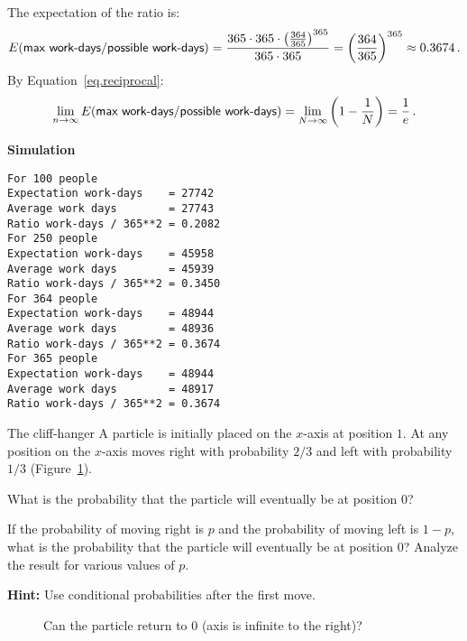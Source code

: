The expectation of the ratio is:
\[
E(\textsf{max work-days/possible work-days})=\displaystyle\frac{365\cdot 365  \cdot \left(\frac{364}{365}\right)^{365}}{365\cdot 365}=\left(\displaystyle\frac{364}{365}\right)^{365}\approx 0.3674\,.
\]
By Equation~\ref{eq.reciprocal}:
\[
\lim_{n\rightarrow\infty}E(\textsf{max work-days/possible work-days})=\lim_{N\rightarrow \infty} \left(1-\displaystyle\frac{1}{N}\right)= \displaystyle\frac{1}{e}\,.
\]

\textbf{Simulation}
\begin{verbatim}
For 100 people
Expectation work-days    = 27742
Average work days        = 27743
Ratio work-days / 365**2 = 0.2082
For 250 people
Expectation work-days    = 45958
Average work days        = 45939
Ratio work-days / 365**2 = 0.3450
For 364 people
Expectation work-days    = 48944
Average work days        = 48936
Ratio work-days / 365**2 = 0.3674
For 365 people
Expectation work-days    = 48944
Average work days        = 48917
Ratio work-days / 365**2 = 0.3674
\end{verbatim}


\newpage

\begin{prob}{The cliff-hanger}
A particle is initially placed on the $x$-axis at position $1$. At any position on the $x$-axis moves right with probability $2/3$ and left with probability $1/3$ (Figure~\ref{f.ruin1}).

 What is the probability that the particle will eventually be at position $0$?

 If the probability of moving right is $p$ and the probability of moving left is $1-p$, what is the probability that the particle will eventually be at position $0$? Analyze the result for various values of $p$.

\textbf{Hint:} Use conditional probabilities after the first move.
\begin{figure}[tb]
\begin{center}
\end{center}
\caption{Can the particle return to $0$ (axis is infinite to the right)?}\label{f.ruin1}
\end{figure}
\end{prob}

